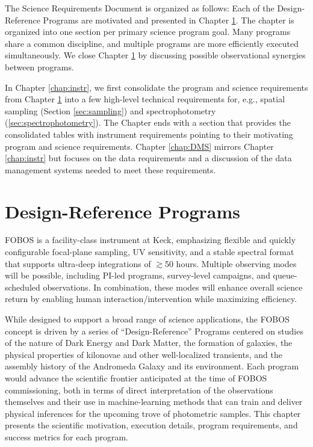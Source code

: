 \documentclass[11pt,a4paper,twoside,onecolumn,openany,final,oldfontcommands]{memoir}
\begin{document}
The Science Requirements Document is organized as follows:  Each of the Design-Reference Programs are motivated and presented in Chapter \ref{chap:key}.  The chapter is organized into one section per primary science program goal.  Many programs share a common discipline, and multiple programs are more efficiently executed simultaneously.  We close Chapter \ref{chap:key} by discussing possible observational synergies between programs. 


In Chapter \ref{chap:instr}, we first consolidate the program and science requirements from Chapter \ref{chap:key} into a few high-level technical requirements for, e.g., spatial sampling (Section \ref{sec:sampling}) and spectrophotometry (\ref{sec:spectrophotometry}). The Chapter ends with a section that provides the consolidated tables with instrument requirements pointing to their motivating program and science requirements. Chapter \ref{chap:DMS} mirrors Chapter \ref{chap:instr} but focuses on the data requirements and a discussion of the data management systems needed to meet these requirements.


\newpage

\chapter{Design-Reference Programs}
\label{chap:key}


FOBOS is a facility-class instrument at Keck, emphasizing flexible and quickly configurable focal-plane sampling, UV sensitivity, and a stable spectral format that supports ultra-deep integrations of $\gtrsim$50 hours.  Multiple observing modes will be possible, including PI-led programs, survey-level campaigns, and queue-scheduled observations.  In combination, these modes will enhance overall science return by enabling human interaction/intervention while maximizing efficiency.  

While designed to support a broad range of science applications, the FOBOS concept is driven by a series of ``Design-Reference'' Programs centered on studies of the nature of Dark Energy and Dark Matter, the formation of galaxies, the physical properties of kilonovae and other well-localized transients, and the assembly history of the Andromeda Galaxy and its environment.  Each program would advance the scientific frontier anticipated at the time of FOBOS commissioning, both in terms of direct interpretation of the observations themselves and their use in machine-learning methods that can train and deliver physical inferences for the upcoming trove of photometric samples.  This chapter presents the scientific motivation, execution details, program requirements, and success metrics for each program.
\end{document}
